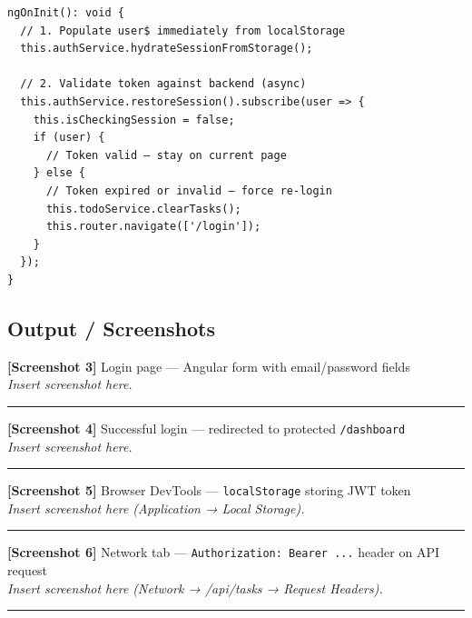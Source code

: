 \documentclass[11pt,a4paper]{article}
\begin{document}
\begin{lstlisting}[style=ts, language={[Sharp]C}]
ngOnInit(): void {
  // 1. Populate user$ immediately from localStorage
  this.authService.hydrateSessionFromStorage();

  // 2. Validate token against backend (async)
  this.authService.restoreSession().subscribe(user => {
    this.isCheckingSession = false;
    if (user) {
      // Token valid — stay on current page
    } else {
      // Token expired or invalid — force re-login
      this.todoService.clearTasks();
      this.router.navigate(['/login']);
    }
  });
}
\end{lstlisting}

\subsection*{Output / Screenshots}

\begin{screenshotbox}
\textbf{[Screenshot 3]} Login page — Angular form with email/password fields\\[4pt]
\textit{Insert screenshot here.}\\[60pt]
\rule{\linewidth}{0.4pt}
\end{screenshotbox}

\begin{screenshotbox}
\textbf{[Screenshot 4]} Successful login — redirected to protected \texttt{/dashboard}\\[4pt]
\textit{Insert screenshot here.}\\[45pt]
\rule{\linewidth}{0.4pt}
\end{screenshotbox}

\begin{screenshotbox}
\textbf{[Screenshot 5]} Browser DevTools — \texttt{localStorage} storing JWT token\\[4pt]
\textit{Insert screenshot here (Application → Local Storage).}\\[45pt]
\rule{\linewidth}{0.4pt}
\end{screenshotbox}

\begin{screenshotbox}
\textbf{[Screenshot 6]} Network tab — \texttt{Authorization: Bearer ...} header on API request\\[4pt]
\textit{Insert screenshot here (Network → /api/tasks → Request Headers).}\\[45pt]
\rule{\linewidth}{0.4pt}
\end{screenshotbox}
\end{document}

